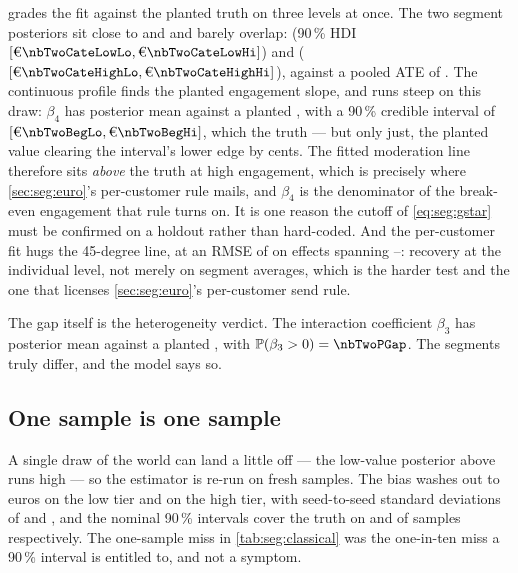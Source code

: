  grades the fit against the planted truth on three levels at once. The two
segment posteriors sit close to \eur{\nbTwoTrueLow} and \eur{\nbTwoTrueHigh} and barely overlap:
\eur{\nbTwoCateLow} (90\,\% HDI $[\eur{\nbTwoCateLowLo}, \eur{\nbTwoCateLowHi}]$) and
\eur{\nbTwoCateHigh} ($[\eur{\nbTwoCateHighLo}, \eur{\nbTwoCateHighHi}]$), against a pooled ATE of
\eur{\nbTwoAte}. The continuous profile finds the planted engagement slope, and runs steep on this
draw: $\beta_4$ has posterior mean \eur{\nbTwoBeg} against a planted \eur{\nbTwoBegTrue}, with a
90\,\% credible interval of $[\eur{\nbTwoBegLo}, \eur{\nbTwoBegHi}]$, which \nbTwoBegCovers{} the
truth --- but only just, the planted value clearing the interval's lower edge by cents. The fitted
moderation line therefore sits \emph{above} the truth at high engagement, which is precisely where
\cref{sec:seg:euro}'s per-customer rule mails, and $\beta_4$ is the denominator of the break-even
engagement that rule turns on. It is one reason the cutoff of \cref{eq:seg:gstar} must be confirmed
on a holdout rather than hard-coded. And the
per-customer fit hugs the 45-degree line, at an RMSE of \eur{\nbTwoRmseInd} on effects spanning
\eur{\nbTwoTauMin}--\eur{\nbTwoTauMax}: recovery at the individual level, not merely on segment
averages, which is the harder test and the one that licenses \cref{sec:seg:euro}'s per-customer send
rule.



The gap itself is the heterogeneity verdict. The interaction coefficient $\beta_3$ has posterior
mean \eur{\nbTwoBev} against a planted \eur{\nbTwoBevTrue}, with $\Prob(\beta_3 > 0) =
\nbTwoPGap$. The segments truly differ, and the model says so.

\subsection*{One sample is one sample}

A single draw of the world can land a little off --- the low-value posterior above runs
\eur{\nbTwoSampleErrLow} high --- so the estimator is re-run on \nbTwoNSeeds{} fresh samples. The bias washes out to
\nbTwoSeedBiasLow{} euros on the low tier and \nbTwoSeedBiasHigh{} on the high tier, with
seed-to-seed standard deviations of \eur{\nbTwoSeedSdLow} and \eur{\nbTwoSeedSdHigh}, and the nominal
90\,\% intervals cover the truth on \nbTwoSeedCovLow{} and \nbTwoSeedCovHigh{} of \nbTwoNSeeds{}
samples respectively. The one-sample miss in \cref{tab:seg:classical} was the one-in-ten miss a
90\,\% interval is entitled to, and not a symptom.

